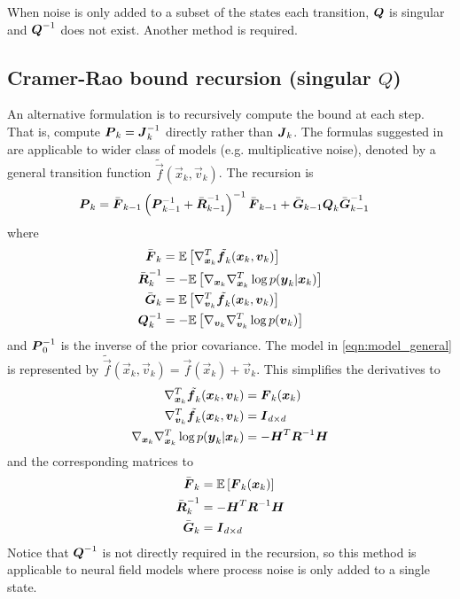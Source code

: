 \documentclass{article}
\begin{document}
When noise is only added to a subset of the states each transition, $\boldsymbol{Q}$ is singular and $\boldsymbol{Q}^{-1}$ does not exist. Another method is required.

\subsection{Cramer-Rao bound recursion (singular $Q$)} 

An alternative formulation is to recursively compute the bound at each step. That is, compute $\boldsymbol{P}_k = \boldsymbol{J}_k^{-1}$ directly rather than $\boldsymbol{J}_k$. The formulas suggested in \cite{Bergman2001} are applicable to wider class of models (e.g. multiplicative noise), denoted by a general transition function $\tilde{\vec f}(\vec x_k,\vec v_k)$. The recursion is
\begin{align}
	\boldsymbol{P}_k &= \bar{\boldsymbol{F}}_{k-1}\left(\boldsymbol{P}_{k-1}^{-1} + \bar{\boldsymbol{R}}_{k-1}^{-1}\right)^{-1}\bar{\boldsymbol{F}}_{k-1} + \bar{\boldsymbol{G}}_{k-1}\boldsymbol{Q}_k \bar{\boldsymbol{G}}_{k-1}^{-1}
\end{align}
where
\begin{align}
	\bar{\boldsymbol{F}}_k &= \mathbb E \left[ \nabla_{{\boldsymbol x}_k}^T \tilde{{\boldsymbol f}_k}({\boldsymbol x}_k,{\boldsymbol v}_k)\right] \\
	\bar{\boldsymbol{R}}_k^{-1} &= -\mathbb E\left[ \nabla_{{\boldsymbol x}_k}\nabla_{{\boldsymbol x}_k}^T \log p({\boldsymbol y}_k|{\boldsymbol x}_k) \right] \\
	\bar{\boldsymbol{G}}_k &= \mathbb E \left[ \nabla_{{\boldsymbol v}_k}^T \tilde{{\boldsymbol f}_k}({\boldsymbol x}_k,{\boldsymbol v}_k)\right] \\
	\boldsymbol{Q}_k^{-1} &= -\mathbb E \left[ \nabla_{{\boldsymbol v}_k}\nabla_{{\boldsymbol v}_k}^T \log p({\boldsymbol v}_k) \right]
\end{align}
and $\boldsymbol{P}_0^{-1}$ is the inverse of the prior covariance. The model in \eqref{eqn:model_general} is represented by $\tilde{\vec f}(\vec x_k,\vec v_k) = \vec f(\vec x_k) + \vec v_k$. This simplifies the derivatives to
\begin{align}
	\nabla_{{\boldsymbol x}_k}^T \tilde{{\boldsymbol f}_k}({\boldsymbol x}_k,{\boldsymbol v}_k) &= \boldsymbol{F}_k({\boldsymbol x}_k) \\
	\nabla_{{\boldsymbol v}_k}^T \tilde{{\boldsymbol f}_k}({\boldsymbol x}_k,{\boldsymbol v}_k) &= \boldsymbol{I}_{d\times d} \\
	\nabla_{{\boldsymbol x}_k}\nabla_{{\boldsymbol x}_k}^T \log p({\boldsymbol y}_k|{\boldsymbol x}_k) &= -\boldsymbol{H}^T\boldsymbol{R}^{-1} \boldsymbol{H} 
\end{align}
and the corresponding matrices to	
\begin{align}
	\bar{\boldsymbol{F}}_k &= \mathbb E\left[ \boldsymbol{F}_k({\boldsymbol x}_k)\right] \label{eqn:pcrb_term_F}\\
	\bar{\boldsymbol{R}}_k^{-1} &= -\boldsymbol{H}^T\boldsymbol{R}^{-1} \boldsymbol{H} \\
	\bar{\boldsymbol{G}}_k &= \boldsymbol{I}_{d\times d} 
\end{align}
Notice that $\boldsymbol{Q}^{-1}$ is not directly required in the recursion, so this method is applicable to neural field models where process noise is only added to a single state.
\end{document}
